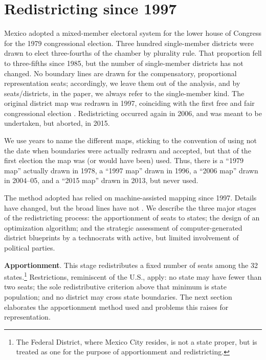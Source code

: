 \documentclass[letter,12pt]{article}
\begin{document}
\section{Redistricting since 1997}

Mexico adopted a mixed-member electoral system for the lower house of Congress for the 1979 congressional election. Three hundred single-member districts were drawn to elect three-fourths of the chamber by plurality rule. That proportion fell to three-fifths since 1985, but the number of single-member districts has not changed. No boundary lines are drawn for the compensatory, proportional representation seats; accordingly, we leave them out of the analysis, and by seats/districts, in the paper, we always refer to the single-member kind. The original district map was redrawn in 1997, coinciding with the first free and fair congressional election \citep{lujambio.vives.2008}. Redistricting occurred again in 2006, and was meant to be undertaken, but aborted, in 2015. 

We use years to name the different maps, sticking to the convention of using not the date when boundaries were actually redrawn and accepted, but that of the first election the map was (or would have been) used. Thus, there is a ``1979 map'' actually drawn in 1978, a ``1997 map'' drawn in 1996, a ``2006 map'' drawn in 2004--05, and a ``2015 map'' drawn in 2013, but never used.

The method adopted has relied on machine-assisted mapping since 1997. Details have changed, but the broad lines have not \citep{trelles.mtz.tesisItam.2007}. We describe the three major stages of the redistricting process: the apportionment of seats to states; the design of an optimization algorithm; and the strategic assessment of computer-generated district blueprints by a technocrats with active, but limited involvement of political parties. 

\textbf{Apportionment}. This stage redistributes a fixed number of seats among the 32 states.\footnote{The Federal District, where Mexico City resides, is not a state proper, but is treated as one for the purpose of apportionment and redistricting.} Restrictions, reminiscent of the U.S., apply: no state may have fewer than two seats; the sole redistributive criterion above that minimum is state population; and no district may cross state boundaries. The next section elaborates the apportionment method used and problems this raises for representation. 
\end{document}
